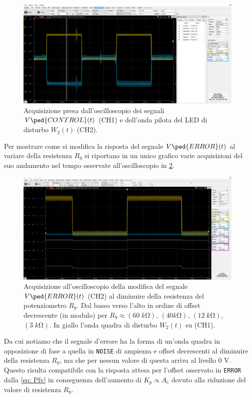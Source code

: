 \documentclass[10pt, a4paper, italian]{article}
\begin{document}
\begin{figure}[htbp]
    \centering
	\includegraphics[width=\textwidth]{proportional.control}
    \caption{Acquisizione presa dall'oscilloscopio dei segnali
    $V\ped{CONTROL} (t)$ (CH1) e dell'onda pilota del LED di disturbo
    $W_2 (t)$ (CH2).
    \label{fig: propctrlnoise}}
\end{figure}

Per mostrare come si modifica la risposta del segnale $V\ped{ERROR} (t)$ al
variare della resistenza $R_9$ si riportano in un unico grafico varie
acquisizioni del suo andamento nel tempo osservate all'oscilloscopio 
in \cref{fig: propR9}.
\begin{figure}[htbp]
    \centering
	\includegraphics[width=\textwidth]{propR9}
    \caption{Acquisizione all'oscilloscopio della modifica del segnale
    $V\ped{ERROR} (t)$ (CH2) al diminuire della resistenza del potenziometro
    $R_9$. Dal basso verso l'alto in ordine di offset decrescente (in modulo)
    per $R_9 \approx (60 \; \si{k\ohm})$, $(40 \si{k\ohm})$,
    $(12 \; \si{k\ohm})$, $(3 \; \si{k\ohm})$.
    In giallo l'onda quadra di disturbo $W_2 (t)$ su (CH1).
    \label{fig: propR9}}
\end{figure}

Da cui notiamo che il segnale d'errore ha la forma di un'onda quadra in
opposizione di fase a quella in \verb+NOISE+ di ampiezza e offset decrescenti
al diminuire della resistenza $R_9$, ma che per nessun valore di questa arriva
al livello $0$ V. Questo risulta compatibile con la risposta attesa per
l'offset osservato in \verb+ERROR+ dalla \cref{eq: Pfv} in conseguenza
dell'aumento di $K_p \propto A_e$ dovuto alla riduzione del valore di
resistenza $R_9$.
\end{document}
